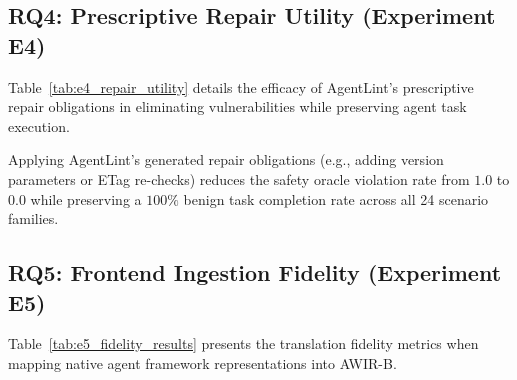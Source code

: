 \subsection{RQ4: Prescriptive Repair Utility (Experiment E4)}
Table~\ref{tab:e4_repair_utility} details the efficacy of AgentLint's prescriptive repair obligations in eliminating vulnerabilities while preserving agent task execution.

\begin{table}[h]
\centering
\caption{Prescriptive Repair Utility \& Task Preservation (Experiment E4)}
\label{tab:e4_repair_utility}
\end{table}

Applying AgentLint's generated repair obligations (e.g., adding version parameters or ETag re-checks) reduces the safety oracle violation rate from $1.0$ to $0.0$ while preserving a $100\%$ benign task completion rate across all 24 scenario families.

\subsection{RQ5: Frontend Ingestion Fidelity (Experiment E5)}
Table~\ref{tab:e5_fidelity_results} presents the translation fidelity metrics when mapping native agent framework representations into \textsf{AWIR-B}.

\begin{table}[h]
\centering
\caption{Frontend IR Ingestion Fidelity (Experiment E5)}
\label{tab:e5_fidelity_results}
\end{table}


